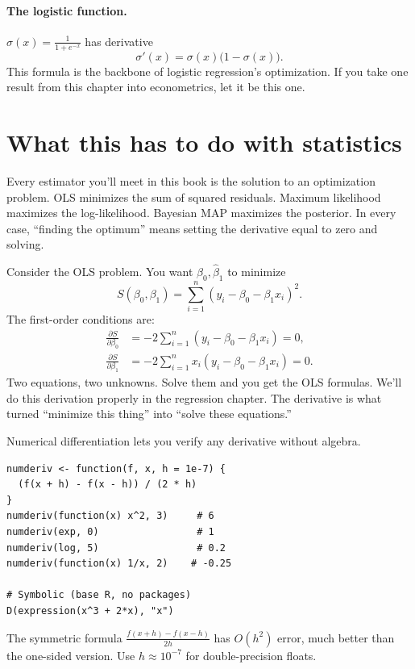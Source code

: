 \paragraph{The logistic function.} $\sigma(x) = \frac{1}{1 + e^{-x}}$ has derivative
\[
  \sigma'(x) = \sigma(x)\bigl(1 - \sigma(x)\bigr).
\]
This formula is the backbone of logistic regression's optimization. If you take one result from this chapter into econometrics, let it be this one.

\section{What this has to do with statistics}

Every estimator you'll meet in this book is the solution to an optimization problem. OLS minimizes the sum of squared residuals. Maximum likelihood maximizes the log-likelihood. Bayesian MAP maximizes the posterior. In every case, ``finding the optimum'' means setting the derivative equal to zero and solving.

Consider the OLS problem. You want $\hat\beta_0, \hat\beta_1$ to minimize
\[
  S(\beta_0, \beta_1) = \sum_{i=1}^{n} (y_i - \beta_0 - \beta_1 x_i)^2.
\]
The first-order conditions are:
\begin{align}
  \frac{\partial S}{\partial \beta_0} &= -2\sum_{i=1}^{n}(y_i - \beta_0 - \beta_1 x_i) = 0, \label{eq:foc-b0-preview} \\[4pt]
  \frac{\partial S}{\partial \beta_1} &= -2\sum_{i=1}^{n} x_i(y_i - \beta_0 - \beta_1 x_i) = 0. \label{eq:foc-b1-preview}
\end{align}
Two equations, two unknowns. Solve them and you get the OLS formulas. We'll do this derivation properly in the regression chapter. The derivative is what turned ``minimize this thing'' into ``solve these equations.''

\begin{codelab}
Numerical differentiation lets you verify any derivative without algebra.

\begin{lstlisting}[language=Rlang]
numderiv <- function(f, x, h = 1e-7) {
  (f(x + h) - f(x - h)) / (2 * h)
}
numderiv(function(x) x^2, 3)     # 6
numderiv(exp, 0)                 # 1
numderiv(log, 5)                 # 0.2
numderiv(function(x) 1/x, 2)    # -0.25

# Symbolic (base R, no packages)
D(expression(x^3 + 2*x), "x")
\end{lstlisting}

The symmetric formula $\frac{f(x+h) - f(x-h)}{2h}$ has $O(h^2)$ error, much better than the one-sided version. Use $h \approx 10^{-7}$ for double-precision floats.
\end{codelab}


